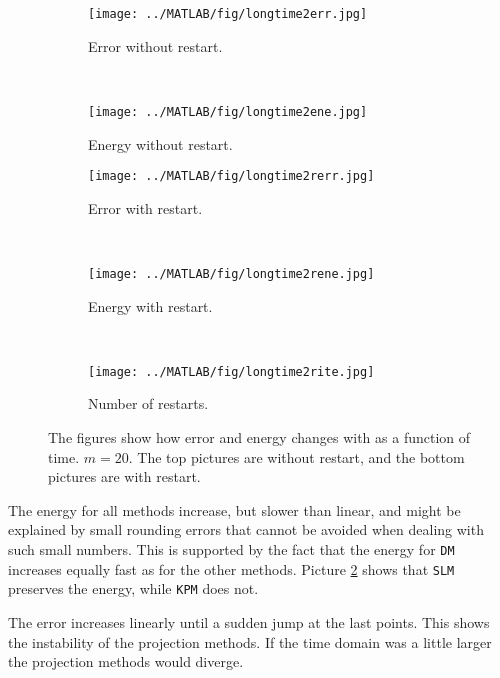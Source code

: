 \begin{figure}[H]
        \centering
        \begin{subfigure}[b]{0.3\textwidth}
                \texttt{[image: ../MATLAB/fig/longtime2err.jpg]}
                \caption{ Error without restart. }
                \label{fig:longtime2err}
        \end{subfigure}
        ~
        \begin{subfigure}[b]{0.3\textwidth}
                \texttt{[image: ../MATLAB/fig/longtime2ene.jpg]}
                \caption{ Energy without restart. }
                \label{fig:longtime8err}
        \end{subfigure}
        
        \begin{subfigure}[b]{0.3\textwidth}
                \texttt{[image: ../MATLAB/fig/longtime2rerr.jpg]}
                \caption{ Error with restart. }
                \label{fig:longtime2rerr}
        \end{subfigure}
        ~
        \begin{subfigure}[b]{0.3\textwidth}
                \texttt{[image: ../MATLAB/fig/longtime2rene.jpg]}
                \caption{ Energy with restart. }
                \label{fig:longtime8rerr}
        \end{subfigure}
        ~
        \begin{subfigure}[b]{0.3\textwidth}
                \texttt{[image: ../MATLAB/fig/longtime2rite.jpg]}
                \caption{ Number of restarts. }
                \label{fig:longtime2rene}
        \end{subfigure}
        \caption{ The figures show how error and energy changes with as a function of time. $m = 20$. The top pictures are without restart, and the bottom pictures are with restart. }
        \label{fig:SLMenergyerror0}
\end{figure}
The energy for all methods increase, but slower than linear, and might be explained by small rounding errors that cannot be avoided when dealing with such small numbers. This is supported by the fact that the energy for \texttt{DM} increases equally fast as for the other methods. Picture \ref{fig:longtime8err} shows that \texttt{SLM} preserves the energy, while \texttt{KPM} does not.


\noindent The error increases linearly until a sudden jump at the last points. This shows the instability of the projection methods. If the time domain was a little larger the projection methods would diverge. \\


